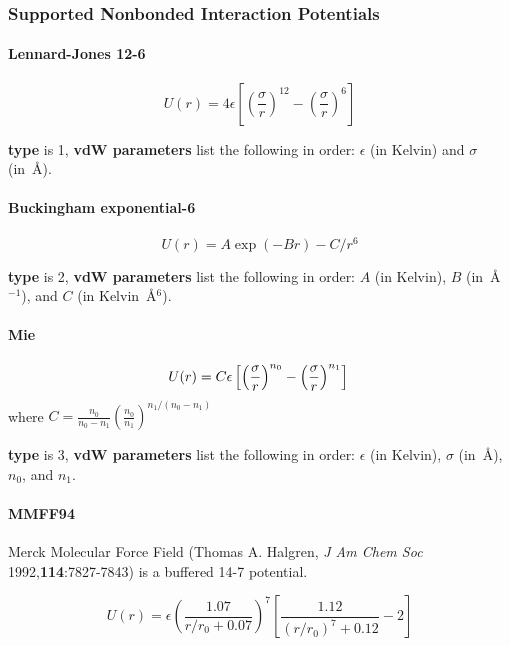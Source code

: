 \documentclass[12pt,letterpaper]{article}
\begin{document}
\subsubsection{Supported Nonbonded Interaction Potentials}
\label{vdW}
\paragraph{Lennard-Jones 12-6}

\begin{equation}
U(r) = 4 \epsilon \left[\left(\frac{\sigma}{r}\right)^{12}
-\left(\frac{\sigma}{r}\right)^6 \right]
\end{equation}

{\bf type} is 1, {\bf vdW parameters} list the following in
order: $\epsilon$ (in Kelvin) and $\sigma$ (in~\AA).

\paragraph{Buckingham exponential-6}
\begin{equation}
U(r) = A \exp(-Br) - C/r^6
\end{equation}

{\bf type} is 2, {\bf vdW parameters} list the following in
order: $A$ (in Kelvin), $B$ (in~\AA$^{-1}$), and $C$ (in
Kelvin~\AA$^6$).

\paragraph{Mie}
\begin{equation}
U(r) = C \epsilon \left[\left(\frac{\sigma}{r}\right)^{n_0}
-\left(\frac{\sigma}{r}\right)^{n_1} \right] \\
\end{equation}
where $C = \frac{n_0}{n_0-n_1} \left(\frac{n_0}{n_1}\right)^{n_1/(n_0-n_1)}$

{\bf type} is 3, {\bf vdW parameters} list the following in
order: $\epsilon$ (in Kelvin), $\sigma$ (in~\AA), $n_0$, and
$n_1$.

\paragraph{MMFF94}
Merck Molecular Force Field (Thomas A. Halgren, \textit{J Am
  Chem Soc} 1992,\textbf{114}:7827-7843) is a buffered 14-7
potential.

\begin{equation}
U(r) = \epsilon \left( \frac{1.07}{r/r_0+0.07} \right)^7
\left[ \frac{1.12}{(r/r_0)^7+0.12}-2 \right]
\end{equation}
\end{document}
